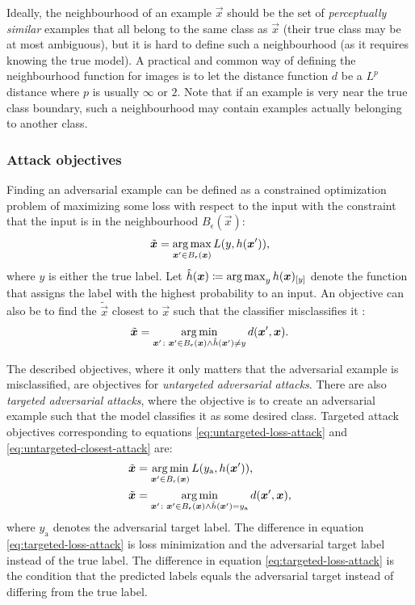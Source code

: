 \documentclass[twocolumn]{article}
\begin{document}
Ideally, the neighbourhood of an example $\vec x$ should be the set of \textit{perceptually similar} examples that all belong to the same class as $\vec x$ (their true class may be at most ambiguous), but it is hard to define such a neighbourhood (as it requires knowing the true model). A practical and common way of defining the neighbourhood function for images is to let the distance function $d$ be a $L^p$ distance where $p$ is usually $\infty$ or $2$. Note that if an example is very near the true class boundary, such a neighbourhood may contain examples actually belonging to another class. 

\subsubsection{Attack objectives}

Finding an adversarial example can be defined as a constrained optimization problem of maximizing some loss with respect to the input with the constraint that the input is in the neighbourhood $B_\epsilon(\vec x)$:
\begin{align}
    \tilde{\vec x} = \argmax_{\vec x'\in B_\epsilon(\vec x)} L(y, h(\vec x')) \text{,} \label{eq:untargeted-loss-attack}
\end{align}
where $y$ is either the true label. Let $\hat{h}(\vec x) \coloneqq \argmax_{y} h(\vec x)_\ind{y}$ denote the function that assigns the label with the highest probability to an input.
An objective can also be to find the $\tilde{\vec x}$ closest to $\vec x$ such that the classifier misclassifies it \citep{Moosavi-Dezfooli:2016:DFSAMFDNN}:
\begin{align}
    \tilde{\vec x} = \argmin_{\vec x'\colon \vec x'\in B_\epsilon(\vec x) \land \hat{h}(\vec x') \neq y} d(\vec x', \vec x) \text{.} \label{eq:untargeted-closest-attack}
\end{align}

The described objectives, where it only matters that the adversarial example is misclassified, are objectives for \textit{untargeted adversarial attacks}. There are also \textit{targeted adversarial attacks}, where the objective is to create an adversarial example such that the model classifies it as some desired class. Targeted attack objectives corresponding to equations \eqref{eq:untargeted-loss-attack} and \eqref{eq:untargeted-closest-attack} are:
\begin{align}
    \tilde{\vec x} &= \argmin_{\vec x'\in B_\epsilon(\vec x)} L(y_\text{a}, h(\vec x')) \text{,} \label{eq:targeted-loss-attack} \\
    \tilde{\vec x} &= \argmin_{\vec x'\colon \vec x'\in B_\epsilon(\vec x) \land \hat{h}(\vec x') = y_\text{a}} d(\vec x', \vec x) \text{,} \label{eq:targeted-closest-attack}
\end{align}
where $y_\text{a}$ denotes the adversarial target label. The difference in equation \eqref{eq:targeted-loss-attack} is loss minimization and the adversarial target label instead of the true label. The difference in equation \eqref{eq:targeted-loss-attack} is the condition that the predicted labels equals the adversarial target instead of differing from the true label.
\end{document}
